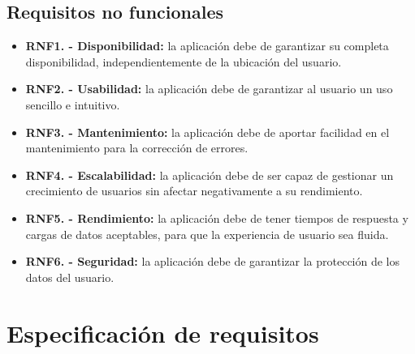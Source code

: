 \subsection{Requisitos no funcionales}
\begin{itemize}
    \item \textbf{RNF1. - Disponibilidad:} la aplicación debe de garantizar su completa disponibilidad, independientemente de la ubicación del usuario.
    \item \textbf{RNF2. - Usabilidad:} la aplicación debe de garantizar al usuario un uso sencillo e intuitivo.
    \item \textbf{RNF3. - Mantenimiento:} la aplicación debe de aportar facilidad en el mantenimiento para la corrección de errores.
    \item \textbf{RNF4. - Escalabilidad:} la aplicación debe de ser capaz de gestionar un crecimiento de usuarios sin afectar negativamente a su rendimiento.
    \item \textbf{RNF5. - Rendimiento:} la aplicación debe de tener tiempos de respuesta y cargas de datos aceptables, para que la experiencia de usuario sea fluida.
    \item \textbf{RNF6. - Seguridad:} la aplicación debe de garantizar la protección de los datos del usuario.
\end{itemize}

\section{Especificación de requisitos}

